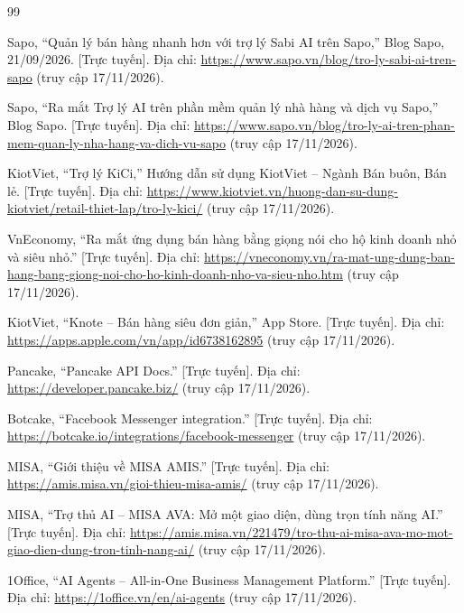 \clearpage{}
\begin{thebibliography}{99}
\small

Sapo, ``Quản lý bán hàng nhanh hơn với trợ lý Sabi AI trên Sapo,'' Blog Sapo, 21/09/2026. [Trực tuyến]. Địa chỉ: \url{https://www.sapo.vn/blog/tro-ly-sabi-ai-tren-sapo} (truy cập 17/11/2026).

Sapo, ``Ra mắt Trợ lý AI trên phần mềm quản lý nhà hàng và dịch vụ Sapo,'' Blog Sapo. [Trực tuyến]. Địa chỉ: \url{https://www.sapo.vn/blog/tro-ly-ai-tren-phan-mem-quan-ly-nha-hang-va-dich-vu-sapo} (truy cập 17/11/2026).

KiotViet, ``Trợ lý KiCi,'' Hướng dẫn sử dụng KiotViet -- Ngành Bán buôn, Bán lẻ. [Trực tuyến]. Địa chỉ: \url{https://www.kiotviet.vn/huong-dan-su-dung-kiotviet/retail-thiet-lap/tro-ly-kici/} (truy cập 17/11/2026).

VnEconomy, ``Ra mắt ứng dụng bán hàng bằng giọng nói cho hộ kinh doanh nhỏ và siêu nhỏ.'' [Trực tuyến]. Địa chỉ: \url{https://vneconomy.vn/ra-mat-ung-dung-ban-hang-bang-giong-noi-cho-ho-kinh-doanh-nho-va-sieu-nho.htm} (truy cập 17/11/2026).

KiotViet, ``Knote -- Bán hàng siêu đơn giản,'' App Store. [Trực tuyến]. Địa chỉ: \url{https://apps.apple.com/vn/app/id6738162895} (truy cập 17/11/2026).

Pancake, ``Pancake API Docs.'' [Trực tuyến]. Địa chỉ: \url{https://developer.pancake.biz/} (truy cập 17/11/2026).

Botcake, ``Facebook Messenger integration.'' [Trực tuyến]. Địa chỉ: \url{https://botcake.io/integrations/facebook-messenger} (truy cập 17/11/2026).

MISA, ``Giới thiệu về MISA AMIS.'' [Trực tuyến]. Địa chỉ: \url{https://amis.misa.vn/gioi-thieu-misa-amis/} (truy cập 17/11/2026).

MISA, ``Trợ thủ AI -- MISA AVA: Mở một giao diện, dùng trọn tính năng AI.'' [Trực tuyến]. Địa chỉ: \url{https://amis.misa.vn/221479/tro-thu-ai-misa-ava-mo-mot-giao-dien-dung-tron-tinh-nang-ai/} (truy cập 17/11/2026).

1Office, ``AI Agents -- All-in-One Business Management Platform.'' [Trực tuyến]. Địa chỉ: \url{https://1office.vn/en/ai-agents} (truy cập 17/11/2026).


\end{thebibliography}
